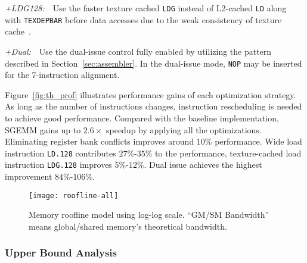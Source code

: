 {\it +LDG128:}~~Use the faster texture cached {\tt LDG} instead of L2-cached {\tt LD} along with {\tt TEXDEPBAR} before data accesses due to the weak consistency of texture cache~\cite{lukyanov2014efficient}.

{\it +Dual:}~~Use the dual-issue control fully enabled by utilizing the pattern described in Section~\ref{sec:assembler}.
In the dual-issue mode, {\tt NOP} may be inserted for the 7-instruction alignment.

Figure~\ref{fig:th_prof} illustrates performance gains of each optimization strategy.
As long as the number of instructions changes, instruction rescheduling is needed to achieve good performance.
Compared with the baseline implementation, SGEMM gains up to $2.6\times$ speedup by applying all the optimizations.
Eliminating register bank conflicts improves around $10\%$ performance. 
Wide load instruction {\tt LD.128} contributes $27\%$-$35\%$ to the performance, texture-cached load instruction {\tt LDG.128} improves $5\%$-$12\%$.
Dual issue achieves the highest improvement $84\%$-$106\%$.


\begin{figure}[htbp]
\begin{center}
\texttt{[image: roofline-all]}
    \caption{\small Memory roofline model using log-log scale. ``GM/SM Bandwidth'' means global/shared memory's theoretical
    bandwidth.} %
\label{fig:roofline_all}
\end{center}
\end{figure}



\subsubsection{Upper Bound Analysis}

